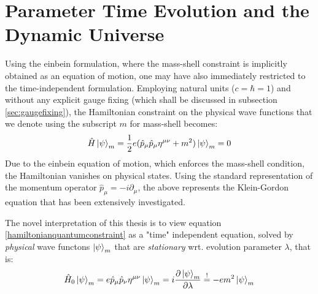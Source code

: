 \documentclass[twoside,a4paper,11pt]{article}
\numberwithin{equation}{section}
\begin{document}
\section{Parameter Time Evolution and the Dynamic Universe}
\label{sec:staticworldinterpretation}
Using the einbein formulation, where the mass-shell constraint is implicitly obtained as an equation of motion, one may have also immediately restricted to the time-independent formulation. Employing natural units ($ c= \hbar = 1$) and without any explicit gauge fixing (which shall be discussed in subsection \ref{sec:gaugefixing}), the Hamiltonian constraint on the physical wave functions that we denote using the subscript $m$ for mass-shell becomes:
\begin{equation}
    \hat{H} \ket{\psi}_m = \frac{1}{2}e ( \hat{p}_\mu \hat{p}_\mu \eta^{\mu\nu} + m^2) \ket{\psi}_m =  0
    \label{hamiltonianquantumconstraint}
\end{equation}
Due to the einbein equation of motion, which enforces the mass-shell condition, the Hamiltonian vanishes on physical states. Using the standard representation of the momentum operator $\hat{p}_\mu = - i  \partial_\mu$, the above represents the Klein-Gordon equation that has been extensively investigated.


The novel interpretation of this thesis is to view equation \ref{hamiltonianquantumconstraint} as a "time" independent equation, solved by \textit{physical} wave functons $\ket{\psi}_m$ that are \textit{stationary} wrt. evolution parameter $\lambda$, that is:
  \begin{equation}
      \hat{H}_0 \ket{\psi}_{m} = e \hat{p}_\mu \hat{p}_\nu \eta^{\mu\nu} \ket{\psi}_{m}=  i \dfrac{\partial \ket{\psi}_{m}}{\partial \lambda} \stackrel{!}{=}   -e m^2 \ket{\psi}_{m}
      \label{parameternergyeigenvalueeqn}
  \end{equation}
\end{document}
